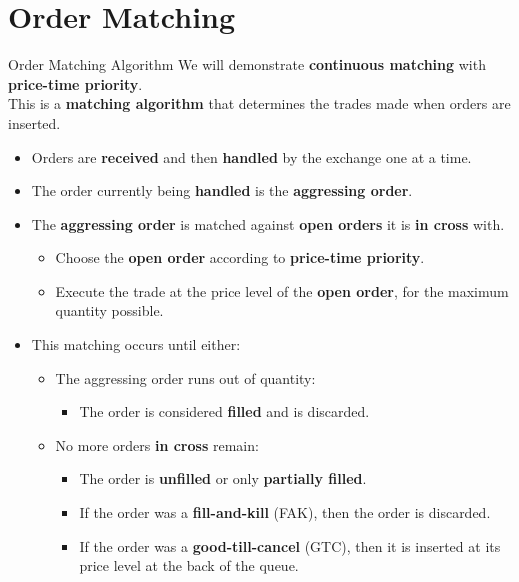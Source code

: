 \section{Order Matching}

\begin{frame}{Order Matching Algorithm}
  We will demonstrate \textbf{continuous matching} with \textbf{price-time priority}.\\
  This is a \textbf{matching algorithm} that determines the trades made when orders are inserted.

  \begin{itemize}
    \item Orders are \textbf{received} and then \textbf{handled} by the exchange one at a time.
    \item The order currently being \textbf{handled} is the \textbf{aggressing order}.
    \item The \textbf{aggressing order} is matched against \textbf{open orders} it is \textbf{in cross} with.
    \begin{itemize}
      \item Choose the \textbf{open order} according to \textbf{price-time priority}.
      \item Execute the trade at the price level of the \textbf{open order}, for the maximum quantity possible.
    \end{itemize}
    \item This matching occurs until either:
    \begin{itemize}
      \item The aggressing order runs out of quantity:
      \begin{itemize}
        \item The order is considered \textbf{filled} and is discarded.
      \end{itemize}
      \item No more orders \textbf{in cross} remain:
      \begin{itemize}
        \item The order is \textbf{unfilled} or only \textbf{partially filled}.
        \item If the order was a \textbf{fill-and-kill} (FAK), then the order is discarded.
        \item If the order was a \textbf{good-till-cancel} (GTC), then it is inserted at its price level at the back of the queue.
      \end{itemize}
    \end{itemize}
  \end{itemize}
\end{frame}

